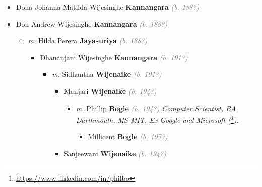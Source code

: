 \documentclass[10pt, openany]{book}
\begin{document}
\begin{itemize}
{\begin{itemize}
{\begin{itemize}
{\begin{itemize}
{\begin{itemize}
{\begin{itemize}
\item{Dimuthu \textbf{Ranasinghe} \textcolor{gray}{\textit{(b. 197?)}}
 }
\end{itemize}}
\end{itemize}
  }
\end{itemize}}
\end{itemize}
   }
\item{Dona Johanna Matilda Wijesinghe \textbf{Kannangara} \textcolor{gray}{\textit{(b. 188?)}}
    }
\item{Don Andrew Wijesinghe \textbf{Kannangara} \textcolor{gray}{\textit{(b. 188?)}}
\begin{itemize}
\item{\textit{m.} Hilda Perera \textbf{Jayasuriya} \textcolor{gray}{\textit{(b. 188?)}}   \label{couple:00000349:00000396} \begin{itemize}
\item{Dhananjani Wijesinghe \textbf{Kannangara} \textcolor{gray}{\textit{(b. 191?)}}
\begin{itemize}
\item{\textit{m.} Sidhantha \textbf{Wijenaike} \textcolor{gray}{\textit{(b. 191?)}}   \label{couple:00000393:00000995} \begin{itemize}
\item{Manjari \textbf{Wijenaike} \textcolor{gray}{\textit{(b. 194?)}}
\begin{itemize}
\item{\textit{m.} Phillip \textbf{Bogle} \textcolor{gray}{\textit{(b. 194?)}} \textcolor{slmaroon}{\textit{Computer Scientist, BA Darthmouth, MS MIT, Ex Google and Microsoft (\footnote{\url{https://www.linkedin.com/in/philbo}}).}}   \label{couple:00000125:00000993} \begin{itemize}
\item{Millicent \textbf{Bogle} \textcolor{gray}{\textit{(b. 197?)}}
 }
\end{itemize}}
\end{itemize}
 }
\item{Sanjeewani \textbf{Wijenaike} \textcolor{gray}{\textit{(b. 194?)}}
 }
\end{itemize}}
\end{itemize}
  }

\end{itemize}}
\end{itemize}}
\end{itemize}}
\end{itemize}
\end{document}
